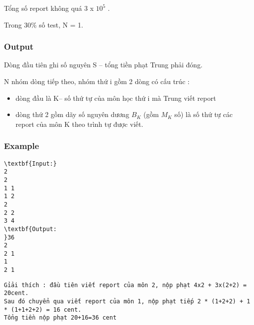 Tổng số report không quá 3 x $10^{5}$ .


Trong 30\% số test, N = 1.

\subsubsection{Output}

Dòng đầu tiên ghi số nguyên S – tổng tiền phạt Trung phải đóng.


N nhóm dòng tiếp theo, nhóm thứ i gồm 2 dòng có cấu trúc :
\begin{itemize}
	\item dòng đầu là K– số thứ tự của môn học thứ i mà Trung viết report
	\item dòng thứ 2 gồm dãy số nguyên dương $B_{K}$ (gồm $M_{K}$ số) là số thứ tự các report của môn K theo trình tự được viết.
\end{itemize}

\subsubsection{Example}
\begin{verbatim}
\textbf{Input:}
2
2
1 1
1 2
2
2 2
3 4
\textbf{Output:
}36
2
2 1
1
2 1\end{verbatim}
\begin{verbatim}
Gỉải thích : đầu tiên viết report của môn 2, nộp phạt 4x2 + 3x(2+2) = 20cent.
Sau đó chuyển qua viết report của môn 1, nộp phạt tiếp 2 * (1+2+2) + 1 * (1+1+2+2) = 16 cent. 
Tổng tiền nộp phạt 20+16=36 cent
\end{verbatim}

